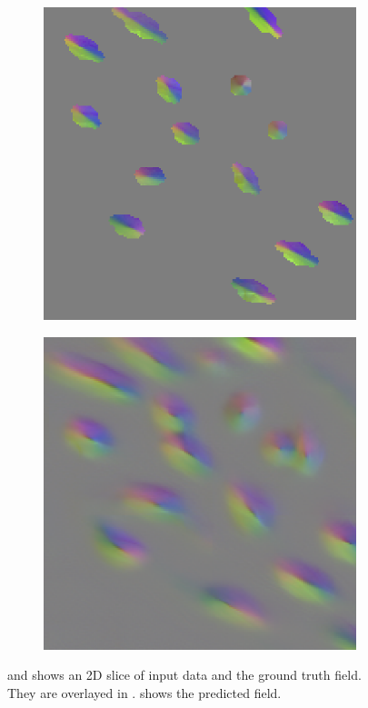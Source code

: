 \begin{figure}[htpb]
	\begin{subfigure}[b]{\mywidth}
		\centering
		\includegraphics[width=\textwidth]{data/images/fieldLearning/fi_field.png}
		\caption{\label{fig:fi_f}}
	\end{subfigure}
	\hspace{3mm}
	\begin{subfigure}[b]{\mywidth}
		\centering
		\includegraphics[width=\textwidth]{data/images/fieldLearning/fi_result.png}
		\caption{\label{fig:fi_r}}
	\end{subfigure}
		
	\caption{ and  shows an 2D slice of input data and the ground truth field. They are overlayed in .  shows the predicted field.}
	\label{fig:learnedField}
\end{figure}

